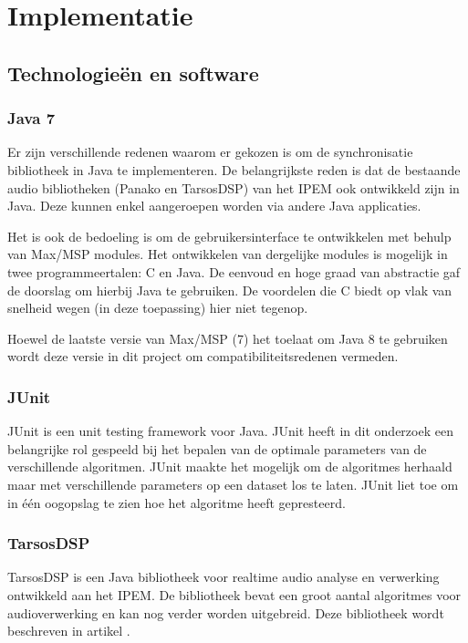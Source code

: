 \chapter{Implementatie}

\section{Technologieën en software}

\subsection{Java 7}

Er zijn verschillende redenen waarom er gekozen is om de synchronisatie bibliotheek in Java te implementeren. De belangrijkste reden is dat de bestaande audio bibliotheken (Panako en TarsosDSP) van het IPEM ook ontwikkeld zijn in Java. Deze kunnen enkel aangeroepen worden via andere Java applicaties.

Het is ook de bedoeling is om de gebruikersinterface te ontwikkelen met behulp van Max/MSP modules. Het ontwikkelen van dergelijke modules is mogelijk in twee programmeertalen: C en Java. De eenvoud en hoge graad van abstractie gaf de doorslag om hierbij Java te gebruiken. De voordelen die C biedt op vlak van snelheid wegen (in deze toepassing) hier niet tegenop.

Hoewel de laatste versie van Max/MSP (7) het toelaat om Java 8 te gebruiken wordt deze versie in dit project om compatibiliteitsredenen vermeden. 

\subsection{JUnit}
JUnit is een unit testing framework voor Java. JUnit heeft in dit onderzoek een belangrijke rol gespeeld bij het bepalen van de optimale parameters van de verschillende algoritmen. JUnit maakte het mogelijk om de algoritmes herhaald maar met verschillende parameters op een dataset los te laten. JUnit liet toe om in één oogopslag te zien hoe het algoritme heeft gepresteerd.

\subsection{TarsosDSP}
\label{tarsos}

TarsosDSP is een Java bibliotheek voor realtime audio analyse en verwerking ontwikkeld aan het IPEM. De bibliotheek bevat een groot aantal algoritmes voor audioverwerking en kan nog verder worden uitgebreid. Deze bibliotheek wordt beschreven in artikel \cite{six2014tarsosdsp}. 

